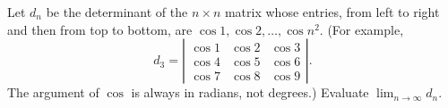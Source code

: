 Let $d_n$ be the determinant of the $n \times n$ matrix whose entries, from
left to right and then from top to bottom, are $\cos 1, \cos 2, \dots, \cos
n^2$. (For example,
\[
 d_3 = \left| \begin{matrix} \cos 1 & \cos 2 & \cos 3 \\
               \cos 4 & \cos 5 & \cos 6 \\
\cos 7 & \cos 8 & \cos 9
              \end{matrix} \right|.
\]
The argument of $\cos$ is always in radians, not degrees.) Evaluate
$\lim_{n\to\infty} d_n$.
